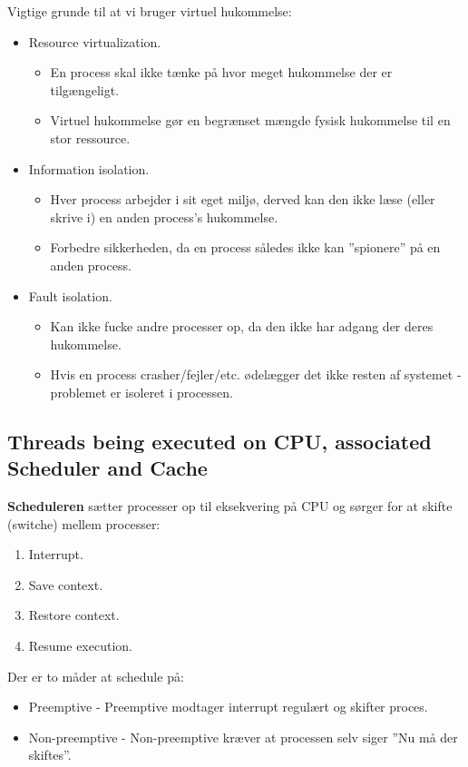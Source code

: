 Vigtige grunde til at vi bruger virtuel hukommelse:

\begin{itemize}
	\item Resource virtualization.
	\begin{itemize}
		\item En process skal ikke tænke på hvor meget hukommelse der er tilgængeligt.
		\item Virtuel hukommelse gør en begrænset mængde fysisk hukommelse til en stor ressource.
	\end{itemize}
	\item Information isolation.
	\begin{itemize}
		\item Hver process arbejder i sit eget miljø, derved kan den ikke læse (eller skrive i) en anden process's hukommelse.
		\item Forbedre sikkerheden, da en process således ikke kan ''spionere'' på en anden process.
	\end{itemize}
	\item Fault isolation.
	\begin{itemize}
		\item Kan ikke fucke andre processer op, da den ikke har adgang der deres hukommelse.
		\item Hvis en process crasher/fejler/etc. ødelægger det ikke resten af systemet - problemet er isoleret i processen.
	\end{itemize}
\end{itemize}

\subsection{Threads being executed on CPU, associated Scheduler and Cache}\label{sec:execpu}
\textbf{Scheduleren} sætter processer op til eksekvering på CPU og sørger for at skifte (switche) mellem processer:

\begin{enumerate}
	\item Interrupt.
	\item Save context.
	\item Restore context.
	\item Resume execution.
\end{enumerate}

Der er to måder at schedule på:

\begin{itemize}
	\item Preemptive - Preemptive modtager interrupt regulært og skifter proces.
	\item Non-preemptive - Non-preemptive kræver at processen selv siger ''Nu må der skiftes''.
\end{itemize}

